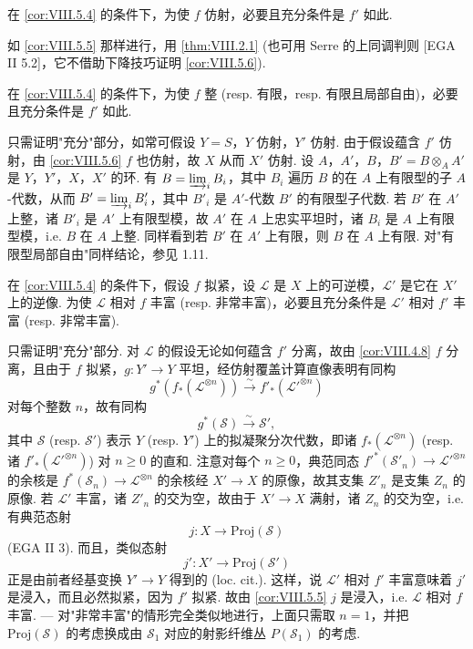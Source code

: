 \begin{corollary}\label{cor:VIII.5.6}
在 \ref{cor:VIII.5.4} 的条件下，为使 $f$ 仿射，必要且充分条件是 $f'$ 如此.
\end{corollary}

如 \ref{cor:VIII.5.5} 那样进行，用 \ref{thm:VIII.2.1} (也可用 Serre 的上同调判则 [EGA II 5.2]，它不借助下降技巧证明 \ref{cor:VIII.5.6}).

\begin{corollary}\label{cor:VIII.5.7}
在 \ref{cor:VIII.5.4} 的条件下，为使 $f$ 整 (resp. 有限，resp. 有限且局部自由)，必要且充分条件是 $f'$ 如此.
\end{corollary}

只需证明"充分"部分，如常可假设 $Y = S$，$Y$ 仿射，$Y'$ 仿射. 由于假设蕴含 $f'$ 仿射，由 \ref{cor:VIII.5.6} $f$ 也仿射，故 $X$ 从而 $X'$ 仿射. 设 $A$，$A'$，$B$，$B' = B \otimes_A A'$ 是 $Y$，$Y'$，$X$，$X'$ 的环. 有 $B = \varinjlim_i B_i$，其中 $B_i$ 遍历 $B$ 的在 $A$ 上有限型的子 $A$-代数，从而 $B' = \varinjlim_i B'_i$，其中 $B'_i$ 是 $A'$-代数 $B'$ 的有限型子代数. 若 $B'$ 在 $A'$ 上整，诸 $B'_i$ 是 $A'$ 上有限型模，故 $A'$ 在 $A$ 上忠实平坦时，诸 $B_i$ 是 $A$ 上有限型模，i.e. $B$ 在 $A$ 上整. 同样看到若 $B'$ 在 $A'$ 上有限，则 $B$ 在 $A$ 上有限. 对"有限型局部自由"同样结论，参见 1.11.

\begin{corollary}\label{cor:VIII.5.8}
在 \ref{cor:VIII.5.4} 的条件下，假设 $f$ 拟紧，设 $\mathcal{L}$ 是 $X$ 上的可逆模，$\mathcal{L}'$ 是它在 $X'$ 上的逆像. 为使 $\mathcal{L}$ 相对 $f$ 丰富 (resp. 非常丰富)，必要且充分条件是 $\mathcal{L}'$ 相对 $f'$ 丰富 (resp. 非常丰富).
\end{corollary}

只需证明"充分"部分. 对 $\mathcal{L}$ 的假设无论如何蕴含 $f'$ 分离，故由 \ref{cor:VIII.4.8} $f$ 分离，且由于 $f$ 拟紧，$g \colon Y' \to Y$ 平坦，经仿射覆盖计算直像表明有同构
\[
g^{*}(f_*(\mathcal{L}^{\otimes n})) \xrightarrow{\sim} f'_*(\mathcal{L}'^{\otimes n})
\]
对每个整数 $n$，故有同构
\[
g^{*}(\mathcal{S}) \xrightarrow{\sim} \mathcal{S}',
\]
其中 $\mathcal{S}$ (resp. $\mathcal{S}'$) 表示 $Y$ (resp. $Y'$) 上的拟凝聚分次代数，即诸 $f_*(\mathcal{L}^{\otimes n})$ (resp. 诸 $f'_*(\mathcal{L}'^{\otimes n})$) 对 $n \geqslant 0$ 的直和. 注意对每个 $n \geqslant 0$，典范同态 $f'^{*}(\mathcal{S}'_n) \to \mathcal{L}'^{\otimes n}$ 的余核是 $f^{*}(\mathcal{S}_n) \to \mathcal{L}^{\otimes n}$ 的余核经 $X' \to X$ 的原像，故其支集 $Z'_n$ 是支集 $Z_n$ 的原像. 若 $\mathcal{L}'$ 丰富，诸 $Z'_n$ 的交为空，故由于 $X' \to X$ 满射，诸 $Z_n$ 的交为空，i.e. 有典范态射
\[
j \colon X \longrightarrow \mathrm{Proj}(\mathcal{S})
\]
(EGA II 3). 而且，类似态射
\[
j' \colon X' \longrightarrow \mathrm{Proj}(\mathcal{S}')
\]
正是由前者经基变换 $Y' \to Y$ 得到的 (loc. cit.). 这样，说 $\mathcal{L}'$ 相对 $f'$ 丰富意味着 $j'$ 是浸入，而且必然拟紧，因为 $f'$ 拟紧. 故由 \ref{cor:VIII.5.5} $j$ 是浸入，i.e. $\mathcal{L}$ 相对 $f$ 丰富. — 对"非常丰富"的情形完全类似地进行，上面只需取 $n = 1$，并把 $\mathrm{Proj}(\mathcal{S})$ 的考虑换成由 $\mathcal{S}_1$ 对应的射影纤维丛 $P(\mathcal{S}_1)$ 的考虑.

